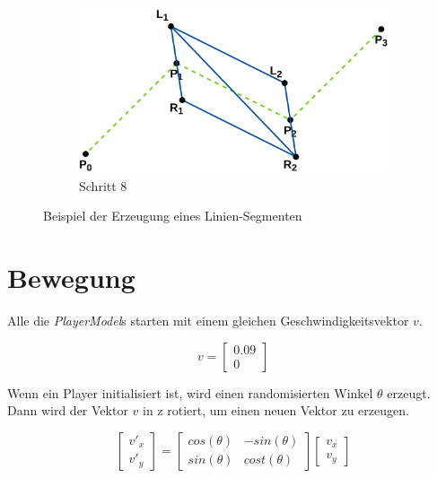 \documentclass[doktyp=studarbeit]{TUBAFarbeiten}
\begin{document}
\begin{figure}[!htb]
\begin{subfigure}[b]{0.35\textwidth}
        \includegraphics[width=1\linewidth]{Schlangenlinie-8.png}
        \caption{Schritt 8}
    \end{subfigure}
    \caption{Beispiel der Erzeugung eines Linien-Segmenten}
	\label{fig:line}
\end{figure}

\section{Bewegung}

Alle die \textit{PlayerModel}s starten mit einem gleichen 
Geschwindigkeitsvektor $v$.

\begin{equation}
    v =
    \begin{bmatrix}
        0.09    \\
        0
    \end{bmatrix}
\end{equation}

Wenn ein Player initialisiert ist, wird einen randomisierten Winkel $\theta$ 
erzeugt. Dann wird der Vektor $v$ in z rotiert, um einen neuen Vektor zu 
erzeugen.

\begin{equation}
    \begin{bmatrix}
        v'_{x} \\
        v'_{y}     
    \end{bmatrix}
    =
    \begin{bmatrix}
        cos(\theta) & -sin(\theta) \\
        sin(\theta) & cost(\theta)
    \end{bmatrix}
    \begin{bmatrix}
        v_{x} \\
        v_{y}
    \end{bmatrix}
    \label{eq:rotation}
\end{equation}
\end{document}
